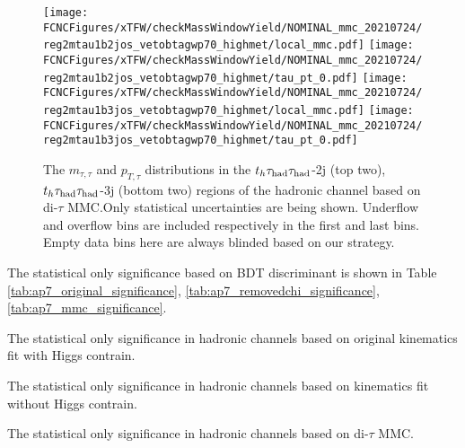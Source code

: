 \begin{figure}[H]
\centering
\texttt{[image: \\FCNCFigures/xTFW/checkMassWindowYield/NOMINAL\_mmc\_20210724/reg2mtau1b2jos\_vetobtagwp70\_highmet/local\_mmc.pdf]}
\texttt{[image: \\FCNCFigures/xTFW/checkMassWindowYield/NOMINAL\_mmc\_20210724/reg2mtau1b2jos\_vetobtagwp70\_highmet/tau\_pt\_0.pdf]}
\texttt{[image: \\FCNCFigures/xTFW/checkMassWindowYield/NOMINAL\_mmc\_20210724/reg2mtau1b3jos\_vetobtagwp70\_highmet/local\_mmc.pdf]}
\texttt{[image: \\FCNCFigures/xTFW/checkMassWindowYield/NOMINAL\_mmc\_20210724/reg2mtau1b3jos\_vetobtagwp70\_highmet/tau\_pt\_0.pdf]}
\caption{The $m_{\tau,\tau}$ and $p_{T,\tau}$ distributions in the $t_h\tau_\text{had}{}\tau_\text{had}$-2j (top two), $t_h\tau_\text{had}{}\tau_\text{had}$-3j (bottom two) regions of the hadronic channel based on di-$\tau$ MMC.Only statistical uncertainties are being shown. Underflow and overflow bins are included respectively in the first and last bins. Empty data bins here are always blinded based on our strategy.}
\label{fig:ap7_ttmass_mmc}
\end{figure}


The statistical only significance based on BDT discriminant is shown in Table \ref{tab:ap7_original_significance}, \ref{tab:ap7_removedchi_significance},\ref{tab:ap7_mmc_significance}.

\begin{table}[H]
\caption{The statistical only significance in hadronic channels based on original kinematics fit with Higgs contrain.}
\label{tab:ap7_original_significance}

\end{table}

\begin{table}[H]
\caption{The statistical only significance in hadronic channels based on kinematics fit without Higgs contrain.}
\label{tab:ap7_removedchi_significance}

\end{table}

\begin{table}[H]
\caption{The statistical only significance in hadronic channels based on di-$\tau$ MMC.}
\label{tab:ap7_mmc_significance}

\end{table}

